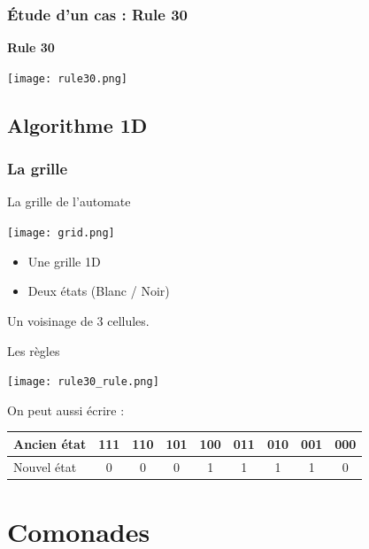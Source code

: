 \documentclass{beamer}
\begin{document}
\begin{frame}
\frametitle{Étude d'un cas : Rule 30}
\begin{center}
\textbf{Rule 30}
\end{center}
\begin{center}
\texttt{[image: rule30.png]}
\end{center}
\end{frame}

\subsection{Algorithme 1D}
\begin{frame}
\frametitle{La grille}
\begin{block}{La grille de l'automate}
\begin{center}
\texttt{[image: grid.png]}
\end{center}
\end{block}
\begin{itemize}
	\item Une grille 1D
	\item Deux états (Blanc / Noir)
\end{itemize}
\end{frame}

\begin{frame}
\begin{block}{}
	Un voisinage de 3 cellules.
\end{block}
\pause
\begin{block}{Les règles}
	\begin{center}
	\texttt{[image: rule30\_rule.png]}
	\end{center}
\end{block}
\pause
\begin{block}{On peut aussi écrire :}
	\begin{center}
	\begin{tabular}{|l|c|c|c|c|c|c|c|c|}
	\hline
	Ancien état & 111 & 110 & 101 & 100 & 011 & 010 & 001 & 000 \\
	\hline
	Nouvel état	& 0   & 0   & 0   & 1   & 1   & 1   & 1   & 0 \\
	\hline
	\end{tabular}
	\end{center}
\end{block}
\end{frame}

\section{Comonades}
\end{document}
